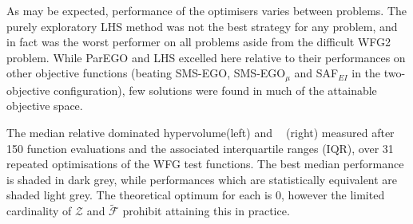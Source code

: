\documentclass[conference]{IEEEtran}
\DeclareMathOperator*{\igdp}{IGD^{+}}
\newcommand\hpv{dominated hypervolume\xspace}
\newcommand\safei{SAF$_{EI}$\xspace}
\newcommand\smsego{SMS-EGO\xspace}
\newcommand\smsegomu{SMS-EGO$_{\mu}$\xspace}
\newcommand\parego{ParEGO\xspace}
\newcommand\lhs{LHS\xspace}
\begin{document}
As may be expected, performance of the optimisers varies between problems. The purely exploratory \lhs method was not the best  strategy for any  problem, and in fact was the worst performer on all problems aside from the difficult WFG2 problem. While \parego and \lhs excelled here relative to their performances on other objective functions (beating \smsego, \smsegomu and \safei in the two-objective configuration), few solutions were found in much of the attainable objective space.


\begin{table}[t]
\centering
\caption{The median relative \hpv (left) and $\igdp$ (right) measured after 150 function evaluations and the associated interquartile ranges (IQR), over 31 repeated optimisations of the WFG test functions. The best median performance is shaded in dark grey, while performances which are statistically equivalent are shaded light grey. The theoretical optimum for each is $0$, however the limited cardinality of $\mathcal{Z}$ and $\tilde{\mathcal{F}}$ prohibit attaining this in practice.}
\begin{subtable}[t]{.49\textwidth}
\begin{subtable}[b]{\textwidth}
\setlength{\tabcolsep}{2pt}
\smallskip
\end{subtable}
\begin{subtable}[b]{\textwidth}
\setlength{\tabcolsep}{2pt}
\smallskip
\end{subtable}
\begin{subtable}[b]{\textwidth}
\setlength{\tabcolsep}{2pt}
\end{subtable}
\end{subtable}
\hfill
\begin{subtable}[t]{0.49\textwidth}
\begin{subtable}[b]{\textwidth}
\setlength{\tabcolsep}{2pt}
\smallskip
\end{subtable}
\begin{subtable}[b]{\textwidth}
\setlength{\tabcolsep}{2pt}
\smallskip
\end{subtable}
\begin{subtable}[b]{\textwidth}
\setlength{\tabcolsep}{2pt}
\end{subtable}
\end{subtable}

\label{tab: results}
\end{table}
\end{document}
